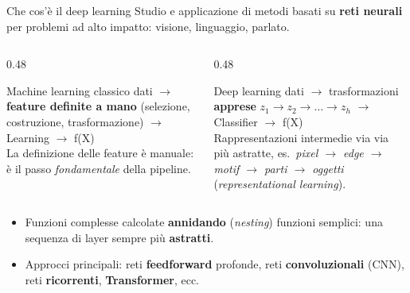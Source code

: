 \documentclass[aspectratio=169]{beamer}
\begin{document}
\begin{frame}{Che cos'è il deep learning}
  Studio e applicazione di metodi basati su \textbf{reti neurali} per problemi
  ad alto impatto: visione, linguaggio, parlato.
  \vspace{0.1cm}
  \begin{columns}[T]
    \begin{column}{0.48\textwidth}
      \begin{block}{Machine learning classico}
        \centering
        {\footnotesize dati $\to$ \textbf{feature definite a mano}
        (selezione, costruzione, trasformazione) $\to$ Learning $\to$ f(X)}
        \\[4pt]
        {\footnotesize La definizione delle feature è manuale: è il
        passo \emph{fondamentale} della pipeline.}
      \end{block}
    \end{column}
    \begin{column}{0.48\textwidth}
      \begin{block}{Deep learning}
        \centering
        {\footnotesize dati $\to$ trasformazioni \textbf{apprese}
        $z_1 \to z_2 \to \dots \to z_h$ $\to$ Classifier $\to$ f(X)}
        \\[4pt]
        {\footnotesize Rappresentazioni intermedie via via più astratte, es.\
        \emph{pixel $\to$ edge $\to$ motif $\to$ parti $\to$ oggetti}
        (\emph{representational learning}).}
      \end{block}
    \end{column}
  \end{columns}
  \vspace{0.1cm}
  \begin{itemize}
    \item Funzioni complesse calcolate \textbf{annidando} (\emph{nesting})
          funzioni semplici: una sequenza di layer sempre più \textbf{astratti}.
    \item Approcci principali: reti \textbf{feedforward} profonde, reti
          \textbf{convoluzionali} (CNN), reti \textbf{ricorrenti},
          \textbf{Transformer}, ecc.
  \end{itemize}
\end{frame}
\end{document}
